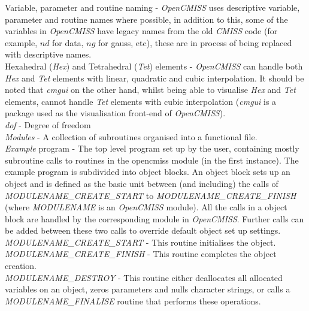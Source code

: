 \noindent Variable, parameter and routine naming - \emph{OpenCMISS} uses 
descriptive variable, parameter and routine names where possible, in 
addition to this, some of the variables in \emph{OpenCMISS} have legacy 
names from the old \emph{CMISS} code (for example, $nd$ for data, $ng$ 
for gauss, etc), these are in process of being replaced with descriptive 
names. \\
\linebreak
Hexahedral (\emph{Hex}) and Tetrahedral (\emph{Tet}) elements - 
\emph{OpenCMISS} can handle both \emph{Hex} and \emph{Tet} elements 
with linear, quadratic and cubic interpolation. It should be noted 
that \emph{cmgui} on the other hand, whilst being able to visualise 
\emph{Hex} and \emph{Tet} elements, cannot handle \emph{Tet} 
elements with cubic interpolation (\emph{cmgui} is a package used 
as the visualisation front-end of \emph{OpenCMISS}). \\
\linebreak
\emph{dof} - Degree of freedom \\
\linebreak
\emph{Modules} - A collection of subroutines organised into a functional file.
\\
\linebreak
\emph{Example} program - The top level program set up by the user, 
containing mostly subroutine calls to routines in the opencmiss 
module (in the first instance). The example program is subdivided 
into object blocks. An object block sets up an object and is defined 
as the basic unit between (and including) the calls of 
\emph{MODULENAME\_CREATE\_START} to \emph{MODULENAME\_CREATE\_FINISH}
(where \emph{MODULENAME} is an \emph{OpenCMISS} module). All the calls 
in a object block are handled by the corresponding module in 
\emph{OpenCMISS}. Further calls can be added between these two calls to 
override default object set up settings. \\
\linebreak
\emph{MODULENAME\_CREATE\_START} - This routine initialises the object. \\
\linebreak
\emph{MODULENAME\_CREATE\_FINISH} - This routine completes the object creation.
\\
\linebreak
\emph{MODULENAME\_DESTROY} - This routine either deallocates all 
allocated variables on an object, zeros parameters and nulls character 
strings, or calls a \emph{MODULENAME\_FINALISE} routine that performs 
these operations.


